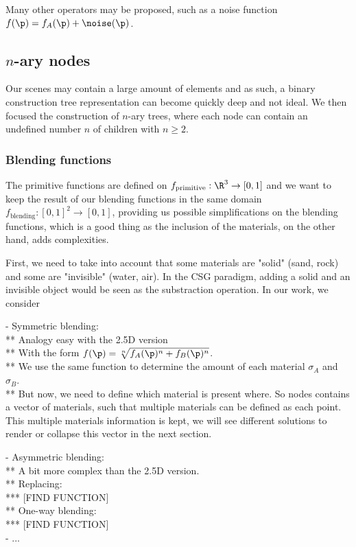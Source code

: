 Many other operators may be proposed, such as a noise function $f(\p) = f_A(\p) + \noise(\p)$.

\subsection{$n$-ary nodes}
Our scenes may contain a large amount of elements and as such, a binary construction tree representation can become quickly deep and not ideal. We then focused the construction of $n$-ary trees, where each node can contain an undefined number $n$ of children with $n \geq 2$.

\subsubsection{Blending functions}
The primitive functions are defined on $f_{\text{primitive}}: \R^3 \to [0,1]$ and we want to keep the result of our blending functions in the same domain $f_{\text{blending}}: [0,1]^2 \to [0,1]$, providing us possible simplifications on the blending functions, which is a good thing as the inclusion of the materials, on the other hand, adds complexities.

First, we need to take into account that some materials are "solid" (sand, rock) and some are "invisible" (water, air). In the CSG paradigm, adding a solid and an invisible object would be seen as the substraction operation. In our work, we consider

- Symmetric blending: \\
** Analogy easy with the 2.5D version \\
** With the form $f(\p) = \sqrt[n]{f_A(\p)^n + f_B(\p)^n}$. \\
** We use the same function to determine the amount of each material $\sigma_A$ and $\sigma_B$. \\
** But now, we need to define which material is present where. So nodes contains a vector of materials, such that multiple materials can be defined as each point. This multiple materials information is kept, we will see different solutions to render or collapse this vector in the next section.

- Asymmetric blending: \\
** A bit more complex than the 2.5D version. \\
** Replacing: \\
*** [FIND FUNCTION] \\
** One-way blending: \\
*** [FIND FUNCTION] \\
- ...


